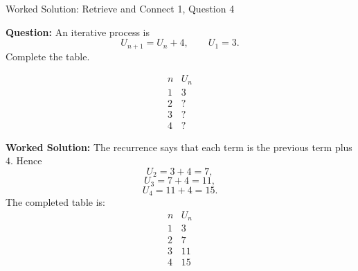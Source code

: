 \documentclass{beamer}
\begin{document}
\begin{frame}{Worked Solution: Retrieve and Connect 1, Question 4}

\textbf{Question:} An iterative process is
\[
U_{n+1} = U_n + 4, \qquad U_1 = 3.
\]
Complete the table.

\[
\begin{array}{c|c}
n & U_n \\
\hline
1 & 3 \\
2 & ? \\
3 & ? \\
4 & ?
\end{array}
\]

\textbf{Worked Solution:} The recurrence says that each term is the previous term plus \(4\). Hence
\[
U_2 = 3 + 4 = 7,
\]
\[
U_3 = 7 + 4 = 11,
\]
\[
U_4 = 11 + 4 = 15.
\]
The completed table is:
\[
\begin{array}{c|c}
n & U_n \\
\hline
1 & 3 \\
2 & 7 \\
3 & 11 \\
4 & 15
\end{array}
\]

\end{frame}
\end{document}

